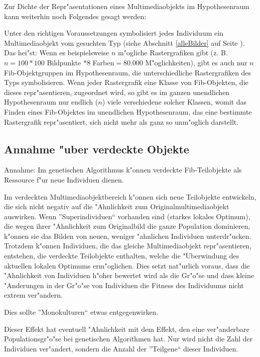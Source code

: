 \bigskip\noindent
Zur Dichte der Repr"asentationen eines Multimediaobjekts im Hypothesenraum kann weiterhin noch Folgendes gesagt werden: 

Unter den richtigen Voraussetzungen symbolisiert jedes Individuum ein Multimediaobjekt vom gesuchten Typ (siehe Abschnitt \ref{alleBilder} auf Seite \pageref{alleBilder}). Das hei"st: Wenn es beispielsweise $n$ m"ogliche Rastergrafiken gibt (z. B. $n = 100 * 100$ Bildpunkte $* 8$ Farben$ = 80.000$ M"oglichkeiten), gibt es auch nur $n$ Fib-Objektgruppen im Hypothesenraum, die unterschiedliche Rastergrafiken des Typs symbolisieren. Wenn jeder Rastergrafik eine Klasse von Fib-Objekten, die dieses repr"asentieren, zugeordnet wird, so gibt es im ganzen unendlichen Hypothesenraum nur endlich ($n$) viele verschiedene solcher Klassen, womit das Finden eines Fib-Objektes im unendlichen Hypothesenraum, das eine bestimmte Rastergrafik repr"asentiert, sich nicht mehr als ganz so unm"oglich darstellt.


\subsection{Annahme "uber verdeckte Objekte}
\label{annVerd}

Annahme: Im genetischen Algorithmus k"onnen verdeckte Fib-Teilobjekte als Ressource f"ur neue Individuen dienen.

\bigskip\noindent
Im verdeckten Multimediaobjektbereich k"onnen sich neue Teilobjekte entwickeln, die sich nicht negativ auf die "Ahnlichkeit zum Originalmultimediaobjekt auswirken. Wenn ''Superindividuen`` vorhanden sind (starkes lokales Optimum), die wegen ihrer "Ahnlichkeit zum Originalbild die ganze Population dominieren, k"onnen sie das Bilden von neuen, weniger "ahnlichen Individuen unterdr"ucken. Trotzdem k"onnen Individuen, die das gleiche Multimediaobjekt repr"asentieren, entstehen, die verdeckte Teilobjekte enthalten, welche die "Uberwindung des aktuellen lokalen Optimums erm"oglichen. Dies setzt nat"urlich voraus, dass die "Ahnlichkeit von Individuen h"oher bewertet wird als die Gr"o"se und dass kleine "Anderungen in der Gr"o"se von Individuen die Fitness des Individuums nicht extrem ver"andern.

Dies sollte ''Monokulturen`` etwas entgegenwirken.

Dieser Effekt hat eventuell "Ahnlichkeit mit dem Effekt, den eine ver"anderbare Populationsgr"o"se bei genetischen Algorithmen hat. Nur wird nicht die Zahl der Individuen ver"andert, sondern die Anzahl der ''Teilgene`` dieser Individuen.



